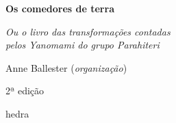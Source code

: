 




\begingroup\thispagestyle{empty}\vspace*{.05\textheight} 

              \formular
              \Huge
              \noindent
              \textbf{Os comedores de terra}

              \bigskip  
              
              \large
              \noindent
              \textit{Ou o livro das transformações contadas\\pelos Yanomami do grupo Parahiteri}
              \vspace{11.8em}
              
              \newfontfamily{}
              {\selectfont\minion\small\noindent Anne Ballester (\textit{organização})}

              \bigskip

              \noindent
              {\selectfont\minion\small\noindent 2ª edição}

              \vfill

              \newfontfamily{}
              {\noindent\fontsize{30}{40}\selectfont \timesnewroman hedra}


              
